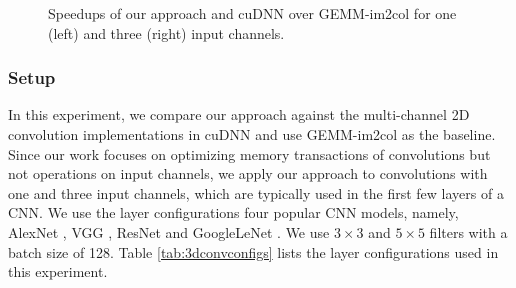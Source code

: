 \begin{figure}
\centering
	
\vspace{-2mm}
\caption{Speedups of our approach and cuDNN over GEMM-im2col for one (left) and three (right) input channels.} \label{fig:multi2druntime}
\vspace{-5mm}
\end{figure}


\subsubsection{Setup} In this experiment, we compare our approach against the multi-channel 2D convolution implementations in cuDNN and use GEMM-im2col as the baseline. Since our work focuses on optimizing memory transactions of convolutions but not operations on input channels, we apply our approach to convolutions with one and three input channels, which are typically used in the first few layers of a CNN. We use the layer configurations four popular CNN models,
namely, AlexNet \cite{Krizhevsky2012ImageNet}, VGG \cite{SimonyanZ14a}, ResNet \cite{HeZRS16} and GoogleLeNet \cite{SzegedyLJSRAEVR15}. We
use $3 \times 3$ and $5 \times 5$ filters with a batch size of 128. Table \ref{tab:3dconvconfigs} lists the layer configurations used in
this experiment.

